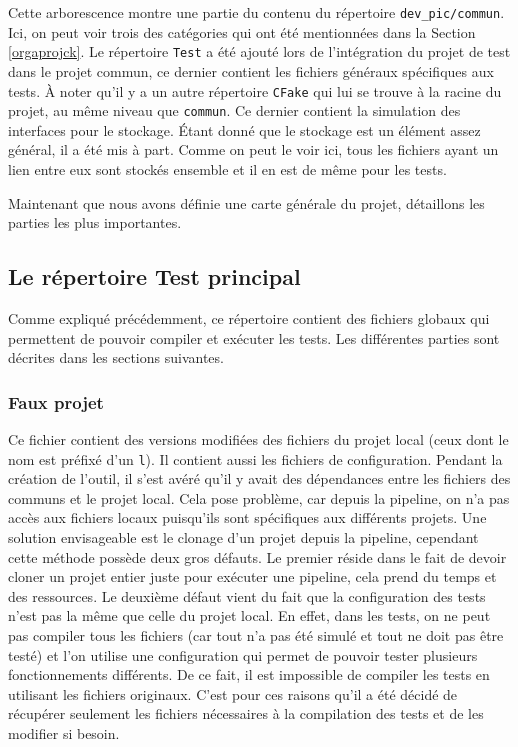\documentclass[a4paper]{article}
\begin{document}
Cette arborescence montre une partie du contenu du répertoire
\verb|dev_pic/commun|. Ici, on peut voir trois des catégories qui ont été
mentionnées dans la Section \ref{orgaprojck}. Le répertoire \verb|Test| a été
ajouté lors de l'intégration du projet de test dans le projet commun, ce dernier
contient les fichiers généraux spécifiques aux tests. À noter qu'il y a un autre
répertoire \verb|CFake| qui lui se trouve à la racine du projet, au même niveau
que \verb|commun|. Ce dernier contient la simulation des interfaces pour le
stockage. Étant donné que le stockage est un élément assez général, il a été mis
à part. Comme on peut le voir ici, tous les fichiers ayant un lien entre eux
sont stockés ensemble et il en est de même pour les tests.

Maintenant que nous avons définie une carte générale du projet, détaillons les
parties les plus importantes.

\subsection{Le répertoire Test principal}

Comme expliqué précédemment, ce répertoire contient des fichiers globaux
qui permettent de pouvoir compiler et exécuter les tests. Les différentes
parties sont décrites dans les sections suivantes.

\subsubsection*{Faux projet} %
\label{fakeproj}

Ce fichier contient des versions modifiées des fichiers du projet local (ceux
dont le nom est préfixé d'un \verb|l|). Il contient aussi les fichiers de
configuration. Pendant la création de l'outil, il s'est avéré qu'il y avait des
dépendances entre les fichiers des communs et le projet local. Cela pose
problème, car depuis la pipeline, on n'a pas accès aux fichiers locaux puisqu'ils
sont spécifiques aux différents projets. Une solution envisageable est le
clonage d'un projet depuis la pipeline, cependant cette méthode possède deux
gros défauts. Le premier réside dans le fait de devoir cloner un projet entier
juste pour exécuter une pipeline, cela prend du temps et des ressources. Le
deuxième défaut vient du fait que la configuration des tests n'est pas la même
que celle du projet local. En effet, dans les tests, on ne peut pas compiler
tous les fichiers (car tout n'a pas été simulé et tout ne doit pas être testé) et
l'on utilise une configuration qui permet de pouvoir tester plusieurs
fonctionnements différents. De ce fait, il est impossible de compiler les tests
en utilisant les fichiers originaux. C'est pour ces raisons qu'il a été décidé
de récupérer seulement les fichiers nécessaires à la compilation des tests et de
les modifier si besoin.
\end{document}

